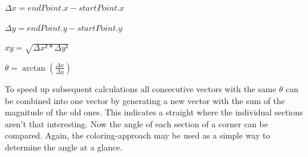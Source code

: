 \begin{minipage}{\textwidth}
\begin{center}
$\Delta x = endPoint.x - startPoint.x$

$\Delta y = endPoint.y - startPoint.y$

$\overline{xy} = \sqrt{\Delta x² * \Delta y²}$

$\theta = \arctan(\frac{\Delta x}{\Delta y})$ 
\end{center}
\end{minipage}

To speed up subsequent calculations all consecutive vectors with the same $\theta$ can be combined into one vector by generating a new vector with the sum of the magnitude of the old ones. This indicates a straight where the individual sections aren't that interesting.
Now the angle of each section of a corner can be compared. Again, the coloring-approach may be used as a simple way to determine the angle at a glance.
\clearpage
